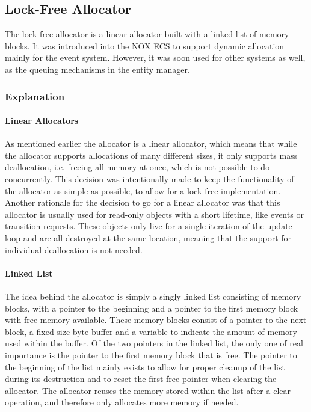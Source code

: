 \subsection{Lock-Free Allocator}
\label{subsec:detailed_lock_free_allocator}
The lock-free allocator is a linear allocator built with a linked list of memory blocks.
It was introduced into the NOX ECS to support dynamic allocation mainly for the event system. However, it was soon used for other systems as well, as the queuing mechanisms in the entity manager.

\subsubsection{Explanation}
\paragraph{Linear Allocators}
As mentioned earlier the allocator is a linear allocator, which means that while the allocator supports allocations of many different sizes,
it only supports mass deallocation, i.e. freeing all memory at once, which is not possible to do concurrently.
This decision was intentionally made to keep the functionality of the allocator as simple as possible, to allow for a lock-free implementation.
Another rationale for the decision to go for a linear allocator was that this allocator is usually used for read-only objects with a short lifetime, like events or transition requests.
These objects only live for a single iteration of the update loop and are all destroyed at the same location, meaning that the support for individual deallocation is not needed.

\paragraph{Linked List}
The idea behind the allocator is simply a singly linked list consisting of memory blocks, with a pointer to the beginning and a pointer to the first memory block with free memory available.
These memory blocks consist of a pointer to the next block, a fixed size byte buffer and a variable to indicate the amount of memory used within the buffer.
Of the two pointers in the linked list, the only one of real importance is the pointer to the first
memory block that is free. 
The pointer to the beginning of the list mainly exists to allow for proper cleanup of the list during its destruction and to reset the first free pointer when clearing the allocator.
The allocator reuses the memory stored within the list after a clear operation, and therefore only
allocates more memory if needed.

